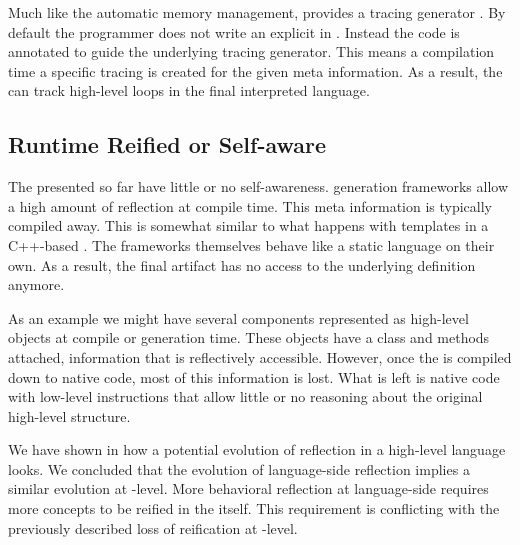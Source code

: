 Much like the automatic memory management, \PyPy provides a tracing \JIT generator \cite{Bolz09a}.
By default the \VM programmer does not write an explicit \JIT in \PyPy.
Instead the \VM code is annotated to guide the underlying tracing \JIT generator.
This means a \VM compilation time a specific tracing \JIT is created for the given meta information.
As a result, the \JIT can track high-level loops in the final interpreted language.


\subsection{Runtime Reified or Self-aware \VMs}

The \VMs presented so far have little or no self-awareness.
\VM generation frameworks allow a high amount of reflection at \VM compile time.
This meta information is typically compiled away.
This is somewhat similar to what happens with templates in a C++-based \VM.
The \VM frameworks themselves behave like a static language on their own.
As a result, the final \VM artifact has no access to the underlying definition anymore.

As an example we might have several \VM components represented as high-level objects at compile or \VM generation time.
These objects have a class and methods attached, information that is reflectively accessible.
However, once the \VM is compiled down to native code, most of this information is lost.
What is left is native code with low-level instructions that allow little or no reasoning about the original high-level structure.

We have shown in  how a potential evolution of reflection in a high-level language looks.
We concluded that the evolution of language-side reflection implies a similar evolution at \VM-level.
More behavioral reflection at language-side requires more concepts to be reified in the \VM itself.
This requirement is conflicting with the previously described loss of reification at \VM-level.

